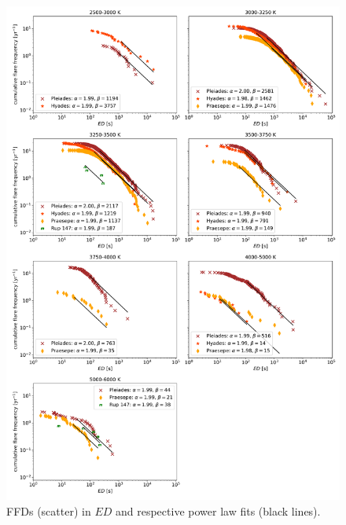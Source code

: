 \documentclass{aa}
\begin{document}
\begin{figure}
    \centering
    \includegraphics[width=16cm]{pics/FFDs/SpT_wise_sample_ffd_ED_wheatland.png}
    \caption{FFDs (scatter) in $ED$ and respective power law fits (black lines).}          	\label{powerlawfits_s}
\end{figure}
\end{document}
